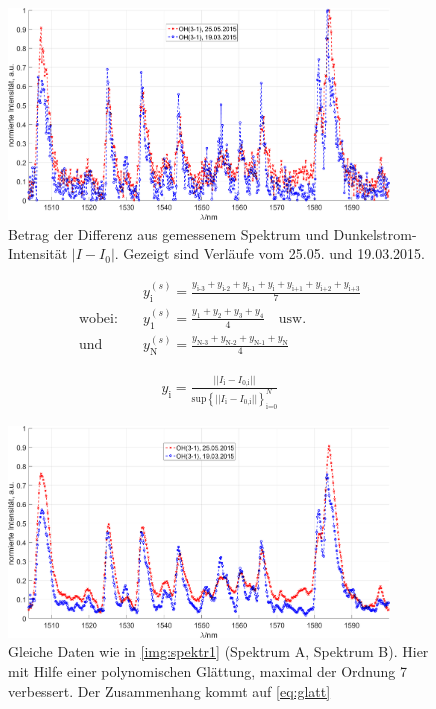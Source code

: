 \documentclass[numbers=noenddot,a4paper,notitlepage,twoside,BCOR15mm]{scrartcl}
\newcommand{\ix}[1]{_\text{#1}}
\begin{document}
				\begin{figure}
					\centering
					\includegraphics[width=0.9\textwidth]{spektr_unsmooth.png}
					\caption{Betrag der Differenz aus gemessenem Spektrum und Dunkelstrom-Intensität $|I-I\ix{0}|$. Gezeigt sind Verläufe vom 25.05. und 19.03.2015.}
					\label{img:spektr1}
				\end{figure}

				\begin{align}
					&y^{(s)}\ix{i}=\frac{y\ix{i-3}+y\ix{i-2}+y\ix{i-1}+y\ix{i}+y\ix{i+1}+y\ix{i+2}+y\ix{i+3}}{7} \label{eq:glatt} \\
					\text{wobei:} \quad &y^{(s)}\ix{1}=\frac{y\ix{1}+y\ix{2}+y\ix{3}+y\ix{4}}{4} \quad \text{usw.}\\
					\text{und} \quad &y^{(s)}\ix{N}=\frac{y\ix{N-3}+y\ix{N-2}+y\ix{N-1}+y\ix{N}}{4}
				\end{align}

				\begin{align}
					y\ix{i}=\frac{||I\ix{i}-I\ix{0,i}||}{\text{sup}\left\lbrace ||I\ix{i}-I\ix{0,i}||\right\rbrace\ix{i=0}^{N}}
				\end{align}

				\begin{figure}
					\centering
					\includegraphics[width=0.9\textwidth]{spektr_smooth.png}
					\caption{Gleiche Daten wie in \autoref{img:spektr1} (Spektrum A, Spektrum B). Hier mit Hilfe einer polynomischen Glättung, maximal der Ordnung 7 verbessert. Der Zusammenhang kommt auf \autoref{eq:glatt}}
					\label{img:spektr2}
				\end{figure}
\end{document}
